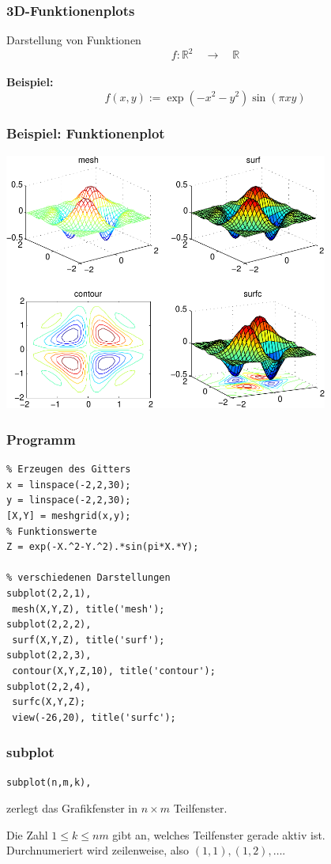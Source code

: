% 
% 
\begin{frame}[fragile]\frametitle{3D-Funktionenplots}

Darstellung von Funktionen
\[ f: \mathbb{R}^2 \quad  \rightarrow \quad \mathbb{R} \]
\hspace*{1cm}\\

\textbf{Beispiel:}\\
\alert{ \[ f(x,y):=\exp(-x^2-y^2)\sin(\pi x y) \]}
\end{frame}
% 
% 
\begin{frame}[fragile]\frametitle{Beispiel: Funktionenplot}
\hfil\includegraphics[width=0.8\textwidth]{./figures/beispiel_function_plot_3d}\hfil
\end{frame}
% 
% 
\begin{frame}[fragile]\frametitle{Programm}
\begin{lstlisting}
% Erzeugen des Gitters
x = linspace(-2,2,30);
y = linspace(-2,2,30);
[X,Y] = meshgrid(x,y);
% Funktionswerte
Z = exp(-X.^2-Y.^2).*sin(pi*X.*Y);

% verschiedenen Darstellungen
subplot(2,2,1),
 mesh(X,Y,Z), title('mesh');
subplot(2,2,2),
 surf(X,Y,Z), title('surf');
subplot(2,2,3),
 contour(X,Y,Z,10), title('contour');
subplot(2,2,4),
 surfc(X,Y,Z);
 view(-26,20), title('surfc');
\end{lstlisting}
\end{frame}
% 
% 
\begin{frame}[fragile]\frametitle{subplot}
\begin{lstlisting}
subplot(n,m,k),
\end{lstlisting}
zerlegt das Grafikfenster in $n \times m$ Teilfenster. 

Die Zahl $1
\leq k \leq nm$ gibt an, welches Teilfenster gerade aktiv
ist. \\

Durchnumeriert wird zeilenweise, also $(1,1), (1,2), \dots$.

\end{frame}

